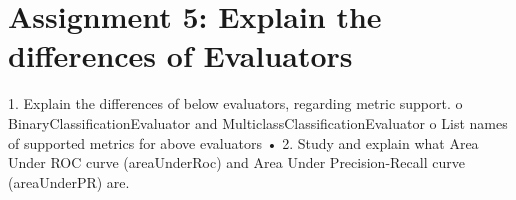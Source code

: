 \documentclass[]{article}
\begin{document}
\section*{Assignment 5: Explain the differences of Evaluators}

1. Explain the differences of below evaluators, regarding metric support.
o BinaryClassificationEvaluator and MulticlassClassificationEvaluator
o List names of supported metrics for above evaluators
• 2. Study and explain what Area Under ROC curve (areaUnderRoc) and Area Under
Precision-Recall curve (areaUnderPR) are.
\end{document}
